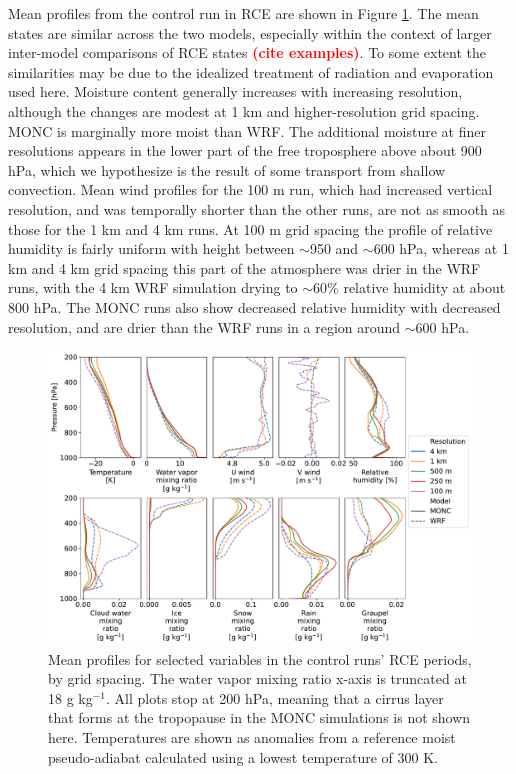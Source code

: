\documentclass[draft]{agujournal2019}
\newcommand{\todo}[1]{\textcolor{red}{\textbf{(#1)}}}
\begin{document}
Mean profiles from the control run in RCE are shown in Figure
\ref{fig:rce_profiles}. The mean states are similar across the two models,
especially within the context of larger inter-model comparisons of RCE states
\todo{cite examples}. To some extent the similarities may be due to the
idealized treatment of radiation and evaporation used here. Moisture content
generally increases with increasing resolution, although the changes are modest
at 1 km and higher-resolution grid spacing. MONC is marginally more moist than
WRF. The additional moisture at finer resolutions appears in the lower part of
the free troposphere above about 900 hPa, which we hypothesize is the result of
some transport from shallow convection. Mean wind profiles for the 100 m run,
which had increased vertical resolution, and was temporally shorter than
the other runs, are not as smooth as those for the 1 km and 4 km runs. At 100 m
grid spacing the profile of relative humidity is fairly uniform with height
between $\sim$950 and $\sim$600 hPa, whereas at 1 km and 4 km grid spacing this
part of the atmosphere was drier in the WRF runs, with the 4 km WRF simulation
drying to $\sim$60\% relative humidity at about 800 hPa. The MONC runs also show
decreased relative humidity with decreased resolution, and are drier than the
WRF runs in a region around $\sim$600 hPa.

\begin{figure}[pth]
    \noindent\includegraphics[width=\textwidth]{figures/rce_profiles}
    \caption{Mean profiles for selected variables in the control runs' RCE
    periods, by grid spacing. The water vapor mixing ratio x-axis is truncated
    at 18 g kg$^{-1}$. All plots stop at 200 hPa, meaning that a cirrus layer
    that forms at the tropopause in the MONC simulations is not shown here.
    Temperatures are shown as anomalies from a reference moist pseudo-adiabat
    calculated using a lowest temperature of 300 K.}
    \label{fig:rce_profiles}
\end{figure}
\end{document}
